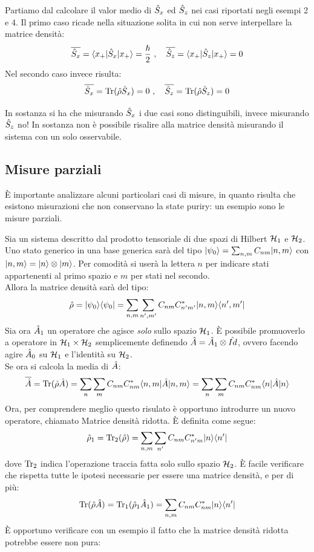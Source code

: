 Partiamo dal calcolare il valor medio di $\SG{x}$ ed $\SG{z}$ nei casi riportati negli esempi 2 e 4. Il primo caso ricade nella situazione solita in cui non serve interpellare la matrice densità:
\[
    \overline{\SG{x}} = \braketin{x_+}{\SG{x}}{x_+} = \frac{\h}{2}\ , \ \ \ \overline{\SG{z}} = \braketin{x_+}{\SG{z}}{x_+} = 0
\]
Nel secondo caso invece risulta:
\[
    \overline{\SG{x}} = \Tr(\hr\SG{x}) = 0\ , \ \ \ \overline{\SG{z}} = \Tr(\hr\SG{z}) = 0
\]

In sostanza si ha che misurando $\SG{x}$ i due casi sono distinguibili, invece misurando $\SG{z}$ no! In sostanza non è possibile risalire alla matrice densità misurando il sistema con un solo osservabile.

\subsection{Misure parziali}
È importante analizzare alcuni particolari casi di misure, in quanto risulta che esistono misurazioni che non conservano la state puriry: un esempio sono le misure parziali.

Sia un sistema descritto dal prodotto tensoriale di due spazi di Hilbert $\Hilb_1$ e $\Hilb_2$. Uno stato generico in una base generica sarà del tipo $\Kp[0] = \sum_{n,m}C_{nm}\Ket {n,m}$ con $\Ket {n,m} = \Ket n \otimes \Ket m$. Per comodità si userà la lettera $n$ per indicare stati appartenenti al primo spazio e $m$ per stati nel secondo.\\
Allora la matrice densità sarà del tipo:
\[
    \hr = \ketbrabra{\psi_0} = \sum_{n,m}\sum_{n',m'} C_{nm}C^*_{n'm'}\ketbra{n,m}{n',m'}
\]
Sia ora $\A_1$ un operatore che agisce \textit{solo} sullo spazio $\Hilb_1$. È possibile promuoverlo a operatore in $\Hilb_1 \times \Hilb_2$ semplicemente definendo $\A = \A_1 \otimes \Id$, ovvero facendo agire $\A_0$ su $\Hilb_1$ e l'identità su $\Hilb_2$.\\
Se ora si calcola la media di $\A$:
\[
    \overline{\A} = \Tr(\hr\A) = \sum_n \sum_{m} C_{nm}C^*_{nm} \braketin{n,m}{\A}{n,m} = \sum_n \sum_{m} C_{nm}C^*_{nm} \braketin{n}{\A}{n}
\]
Ora, per comprendere meglio questo risulato è opportuno introdurre un nuovo operatore, chiamato Matrice densità ridotta. È definita come segue:
\[
    \hr_1 = \Tr_2(\hr) = \sum_{n,m}\sum_{n'} C_{nm}C^*_{n'm} \ketbra{n}{n'}
\]
dove $\Tr_2$ indica l'operazione traccia fatta solo sullo spazio $\Hilb_2$.
È facile verificare che rispetta tutte le ipotesi necessarie per essere una matrice densità, e per di più:
\[
    \Tr(\hr\A) = \Tr_1(\hr_1\A_1) =  \sum_{n,m} C_{nm}C^*_{nm} \ketbra{n}{n'}
\]
È opportuno verificare con un esempio il fatto che la matrice densità ridotta potrebbe essere non pura:

